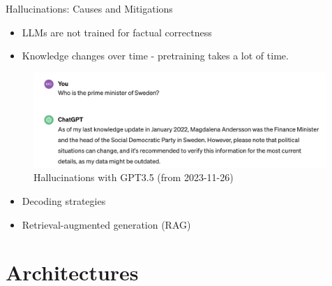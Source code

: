 \documentclass[10pt]{beamer}
\begin{document}
\begin{frame}{Hallucinations: Causes and Mitigations}
\begin{itemize}
\item LLMs are not trained for factual correctness
\item Knowledge changes over time - pretraining takes a lot of time. %
\end{itemize}
\begin{figure}[h]
\centering
\includegraphics[width=0.99\textwidth]{fig/hall2_gpt35}
\caption{Hallucinations with GPT3.5 (from 2023-11-26)}
\end{figure}
\begin{itemize}
\pause
\item Decoding strategies %
\item Retrieval-augmented generation (RAG) %
\end{itemize}

\end{frame}


\section{Architectures}
\end{document}
